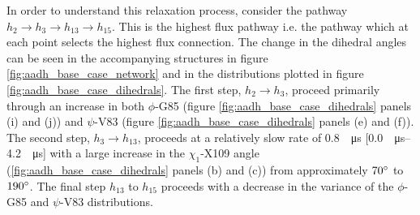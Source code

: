  In order to understand this relaxation process, consider the pathway $h_{2}\rightarrow h_{3} \rightarrow h_{13} \rightarrow h_{15}$. This is the highest flux pathway i.e. the pathway which at each point selects the highest flux connection. The change in the dihedral angles can be seen in the accompanying structures in figure \ref{fig:aadh_base_case_network} and in the distributions plotted in figure \ref{fig:aadh_base_case_dihedrals}.
 The first step, $h_2 \rightarrow h_{3}$, proceed primarily through an increase in both $\phi$-G85 (figure \ref{fig:aadh_base_case_dihedrals} panels (i) and (j)) and $\psi$-V83 (figure \ref{fig:aadh_base_case_dihedrals} panels (e) and (f)). The second step, $h_{3} \rightarrow h_{13}$, proceeds at a relatively slow rate of  \SI{0.8}{\per\micro\second} [\SIrange[range-phrase=-]{0.0}{4.2}{\per\micro\second}] with a large increase in the $\chi_1$-X109 angle (\ref{fig:aadh_base_case_dihedrals} panels (b) and (c)) from approximately $70\degree$ to $190\degree$. The final step $h_{13}$ to $h_{15}$ proceeds with a decrease in the variance of the $\phi$-G85 and $\psi$-V83 distributions.

